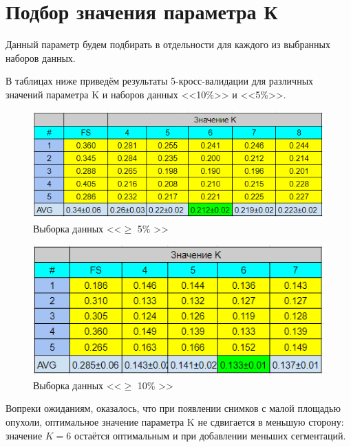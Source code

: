 \section{Подбор значения параметра К}

Данный параметр будем подбирать в отдельности для каждого из выбранных наборов данных. 

В таблицах ниже приведём результаты 5-кросс-валидации для различных значений параметра K и наборов данных <<10\%>> и <<5\%>>.



\begin{figure}[h!] 
  \center
  \includegraphics [scale=1.0] {images/5_percent_experience.png}
  \caption{ Выборка данных <<$\ge$ 5\% >>} 
  \label{fig:5_perc}  
\end{figure}


\begin{figure}[h!] 
  \center
  \includegraphics [scale=1.0] {images/10_percent_experience.png}
  \caption{ Выборка данных <<$\ge$ 10\% >>} 
  \label{fig:10_perc}  
\end{figure}

Вопреки ожиданиям, оказалось, что при появлении снимков с малой площадью опухоли, оптимальное значение параметра K не сдвигается в меньшую сторону: значение $K=6$ остаётся оптимальным и при добавлении меньших сегментаций.

\newpage

